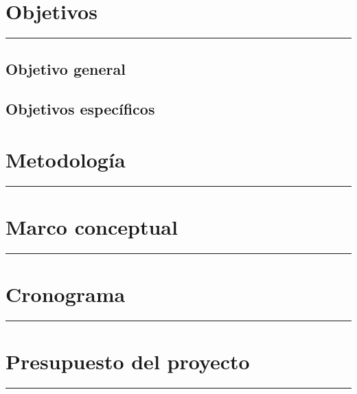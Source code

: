 \documentclass[12pt,twoside]{article}
\begin{document}
\newpage
\section{Objetivos}
\vspace*{0.08\baselineskip}
\hrule
\vspace*{0.7\baselineskip}
\subsection{Objetivo general}

\subsection{Objetivos específicos}




\newpage
\section{Metodología}
\vspace*{0.2\baselineskip}
\hrule
\vspace*{0.7\baselineskip}

\newpage


\section{Marco conceptual}
\vspace*{0.2\baselineskip}
\hrule
\vspace*{0.7\baselineskip}



\newpage
\section{Cronograma}
\vspace*{0.2\baselineskip}
\hrule
\vspace*{0.7\baselineskip}


\newpage
\section{Presupuesto del proyecto}
\vspace*{0.2\baselineskip}
\hrule
\vspace*{0.7\baselineskip}


\newpage

\nocite{*}

\end{document}
